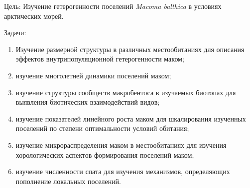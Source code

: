 \begin{desctiption}
	\item[Цель:] Изучение гетерогенности поселений {\it Macoma balthica} в условиях арктических морей.

	\item[Задачи:] 
		\begin{enumerate}
	    \item Изучение размерной %
	структуры в различных местообитаниях для описания эффектов внутрипопуляционной гетерогенности маком;
	    \item изучение многолетней динамики поселений маком;
	    \item изучение структуры сообществ макробентоса в изучаемых биотопах для выявления биотических взаимодействий видов;
	    \item изучение показателей линейного роста маком для шкалирования изученных поселений по степени оптимальности условий обитания;
	    \item изучение микрораспределения маком в местообитаниях для изучения хорологических аспектов формирования поселений маком;
	    \item изучение численности спата для изучения механизмов, определяющих пополнение локальных поселений.
		  \end{enumerate}
\end{desctiption}

 
